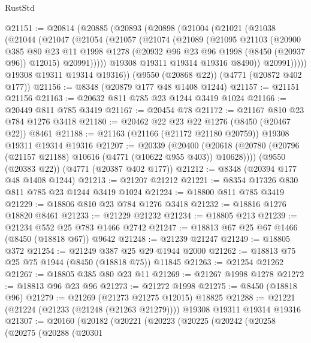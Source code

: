 \begin{lexlean}{RustStd}
\begin{coremodule}
@21151 := @20814
    (@20885
      (@20893
        (@20898
          (@21004
            (@21021
              (@21038
                (@21044
                  (@21047
                    (@21054
                      (@21057
                        (@21074
                          (@21089
                            (@21095
                              @21103
                              (@20900
                                @385
                                @80
                                @23
                                @11
                                @1998
                                @1278
                                (@20932 @96 @23 @96 @1998 (@8450 (@20937 @96)) @12015)
                                @20991)))))
                      @19308
                      @19311
                      @19314
                      @19316
                      @8490))
                  @20991)))))
        @19308
        @19311
        @19314
        @19316))
    (@9550 (@20868 @22))
    (@4771 (@20872 @402 @177))
@21156 := @8348 (@20879 @177 @48 @1408 @1244)
@21157 := @21151 @21156
@21163 := @20632 @811 @785 @23 @1244 @3419 @1024
@21166 := @20449 @811 @785 @3419
@21167 := @20454 @78
@21172 := @21167 @810 @23 @784 @1276 @3418
@21180 := @20462 @22 @23 @22 @1276 (@8450 (@20467 @22)) @8461
@21188 := @21163 (@21166 (@21172 @21180 @20759)) @19308 @19311 @19314 @19316
@21207 := @20339
    (@20400 (@20618 (@20780 (@20796 (@21157 @21188) @10616 (@4771 (@10622 @955 @403)) @10628))))
    (@9550 (@20383 @22))
    (@4771 (@20387 @402 @177))
@21212 := @8348 (@20394 @177 @48 @1408 @1244)
@21213 := @21207 @21212
@21221 := @8354 @17326 @830 @811 @785 @23 @1244 @3419 @1024
@21224 := @18800 @811 @785 @3419
@21229 := @18806 @810 @23 @784 @1276 @3418
@21232 := @18816 @1276 @18820 @8461
@21233 := @21229 @21232
@21234 := @18805 @213
@21239 := @21234 @552 @25 @783 @1466 @2742
@21247 := @18813 @67 @25 @67 @1466 (@8450 (@18818 @67)) @9642
@21248 := @21239 @21247
@21249 := @18805 @372
@21254 := @21249 @387 @25 @29 @1944 @2000
@21262 := @18813 @75 @25 @75 @1944 (@8450 (@18818 @75)) @11845
@21263 := @21254 @21262
@21267 := @18805 @385 @80 @23 @11
@21269 := @21267 @1998 @1278
@21272 := @18813 @96 @23 @96
@21273 := @21272 @1998
@21275 := @8450 (@18818 @96)
@21279 := @21269 (@21273 @21275 @12015) @18825
@21288 := @21221 (@21224 (@21233 (@21248 (@21263 @21279)))) @19308 @19311 @19314 @19316
@21307 := @20160
    (@20182
      (@20221
        (@20223
          (@20225
            (@20242
              (@20258
                (@20275
                  (@20288
                    (@20301

\end{coremodule}
\end{lexlean}
